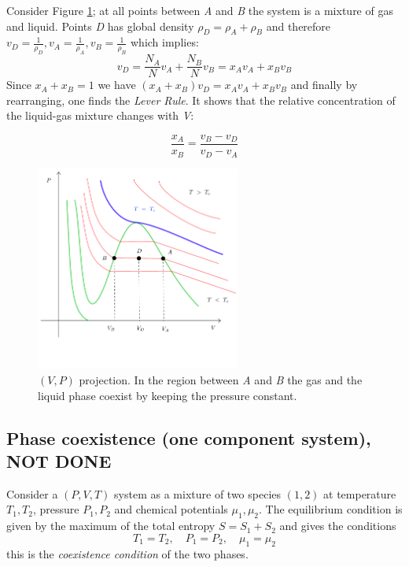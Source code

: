 \documentclass[../../Main/Main.tex]{subfiles}
\begin{document}
\begin{example}{}{}
  Consider Figure \ref{fig:3_0}; at all points between \emph{A} and \emph{B} the system is a mixture of gas and liquid. Points \emph{D} has global density \( \rho_D = \rho_A + \rho_B \)  and therefore \( v_D = \frac{1}{\rho_D}, v_A = \frac{1}{\rho _A}, v_B = \frac{1}{\rho_B} \) which implies:
  \begin{equation*}
    v_D = \frac{N_A}{N} v_A + \frac{N_B}{N} v_B = x_A v_A + x_B v_B
    \label{eq:}
  \end{equation*}
  Since \( x_A + x_B = 1 \) we have \( (x_A + x_B)v_D = x_A v_A + x_B v_B \) and finally by rearranging, one finds the \textit{Lever Rule}. It shows that the relative concentration of the liquid-gas mixture changes with \emph{V}:

  \begin{equation*}
    \frac{x_A}{x_B} = \frac{v_B - v_D}{v_D - v_A}
    \label{eq:}
  \end{equation*}
  
\end{example}

  \begin{figure}[h!]
  \centering
  \includegraphics[width=0.6\textwidth]{./img/1__2.pdf}
  \caption{\label{fig:3_0} \( (V,P) \) projection. In the region between \emph{A} and \emph{B} the gas and the liquid phase coexist by keeping the pressure constant.}
  \end{figure}


\subsection{Phase coexistence (one component system), NOT DONE}

Consider a \( (P,V,T) \) system as a mixture of two species \( (1,2) \) at temperature \( T_1, T_2 \), pressure \( P_1, P_2 \) and chemical potentials \( \mu _1,\mu _2 \). The equilibrium condition is given by the maximum of the total entropy \( S = S_1 + S_2 \) and gives the conditions
\begin{equation}
  T_1 = T_2, \quad P_1 = P_2, \quad \mu _1 = \mu _2
  \label{eq:}
\end{equation}
this is the \emph{coexistence condition} of the two phases.
\end{document}
